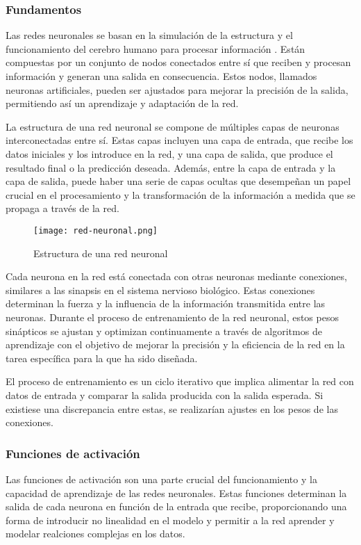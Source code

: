 \subsubsection{Fundamentos}
Las redes neuronales se basan en la simulación de la estructura y el funcionamiento del cerebro humano para procesar información \cite{redes-open}. Están compuestas por un conjunto de nodos conectados entre sí que reciben y procesan información y generan una salida en consecuencia. Estos nodos, llamados neuronas artificiales, pueden ser ajustados para mejorar la precisión de la salida, permitiendo así un aprendizaje y adaptación de la red.

La estructura de una red neuronal se compone de múltiples capas de neuronas interconectadas entre sí. Estas capas incluyen una capa de entrada, que recibe los datos iniciales y los introduce en la red, y una capa de salida, que produce el resultado final o la predicción deseada. Además, entre la capa de entrada y la capa de salida, puede haber una serie de capas ocultas que desempeñan un papel crucial en el procesamiento y la transformación de la información a medida que se propaga a través de la red.

\begin{figure}[H]
    \centering
    \texttt{[image: red-neuronal.png]}
    \caption{Estructura de una red neuronal}
    \label{fig:red-neuronal}
\end{figure}

Cada neurona en la red está conectada con otras neuronas mediante conexiones, similares a las sinapsis en el sistema nervioso biológico. Estas conexiones determinan la fuerza y la influencia de la información transmitida entre las neuronas. Durante el proceso de entrenamiento de la red neuronal, estos pesos sinápticos se ajustan y optimizan continuamente a través de algoritmos de aprendizaje con el objetivo de mejorar la precisión y la eficiencia de la red en la tarea específica para la que ha sido diseñada.

El proceso de entrenamiento es un ciclo iterativo que implica alimentar la red con datos de entrada y comparar la salida producida con la salida esperada. Si existiese una discrepancia entre estas, se realizarían ajustes en los pesos de las conexiones.

\subsubsection{Funciones de activación}
Las funciones de activación son una parte crucial del funcionamiento y la capacidad de aprendizaje de las redes neuronales. Estas funciones determinan la salida de cada neurona en función de la entrada que recibe, proporcionando una forma de introducir no linealidad en el modelo y permitir a la red aprender y modelar realciones complejas en los datos.

